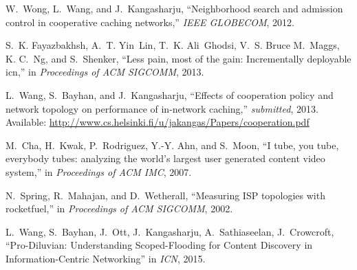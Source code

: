 \documentclass{sigcomm-alternate}
\begin{document}
\begin{thebibliography}{10}
W.~Wong, L.~Wang, and J.~Kangasharju, ``Neighborhood search and admission
  control in cooperative caching networks,'' \emph{IEEE GLOBECOM}, 2012.

S.~K. Fayazbakhsh, A.~T. Yin~Lin, T.~K. Ali~Ghodsi, V.~S. Bruce M.~Maggs, K.
  C.~Ng, and S.~Shenker, ``Less pain, most of the gain: Incrementally
  deployable icn,'' in \emph{Proceedings of ACM SIGCOMM}, 2013.

\BIBentryALTinterwordspacing
L.~Wang, S.~Bayhan, and J.~Kangasharju, ``Effects of cooperation policy and
  network topology on performance of in-network caching,'' \emph{submitted},
  2013. Available:
  \url{http://www.cs.helsinki.fi/u/jakangas/Papers/cooperation.pdf}
\BIBentrySTDinterwordspacing

M.~Cha, H.~Kwak, P.~Rodriguez, Y.-Y. Ahn, and S.~Moon, ``I tube, you tube,
  everybody tubes: analyzing the world's largest user generated content video
  system,'' in \emph{Proceedings of ACM IMC}, 2007.

N.~Spring, R.~Mahajan, and D.~Wetherall, ``Measuring {ISP} topologies with
  rocketfuel,'' in \emph{Proceedings of ACM SIGCOMM}, 2002.

L.~Wang, S.~Bayhan, J.~Ott, J.~Kangasharju, A.~Sathiaseelan, J.~Crowcroft, ``Pro-Diluvian: Understanding Scoped-Flooding for Content Discovery in Information-Centric Networking'' in \emph{ICN}, 2015.

\end{thebibliography}
\end{document}
